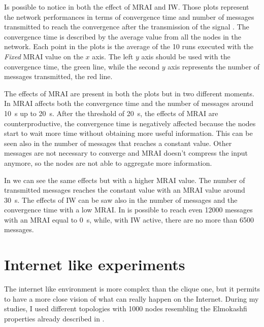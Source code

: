 Is possible to notice in  both the effect of \ac{MRAI}
and \ac{IW}.
Those plots represent the network performances in terms of convergence time and
number of messages transmitted to reach the convergence after the transmission
of the signal .
The convergence time is described by the average value from all the nodes in the
network.
Each point in the plots is the average of the \num{10} runs executed with the
\textit{Fixed} \ac{MRAI} value on the $x$ axis.
The left $y$ axis should be used with the convergence time, the green line, while
the second $y$ axis represents the number of messages transmitted, the red line.

The effects of \ac{MRAI} are present in both the plots but in two different
moments.
In  \ac{MRAI} affects both the convergence time and
the number of messages around \SI{10}{\second} up to \SI{20}{\second}.
After the threshold of \SI{20}{\second}, the effects of \ac{MRAI} are counterproductive,
the convergence time is negatively affected because the nodes start to wait more
time without obtaining more useful information.
This can be seen also in the number of messages that reaches a constant value.
Other messages are not necessary to converge and \ac{MRAI} doesn't compress
the input anymore, so the nodes are not able to aggregate more information.

In  we can see the same effects but with a higher
\ac{MRAI} value.
The number of transmitted messages reaches the constant value with an \ac{MRAI}
value around \SI{30}{\second}.
The effects of \ac{IW} can be saw also in the number of messages and the convergence
time with a low \ac{MRAI}.
In  is possible to reach even \num{12000} messages
with an \ac{MRAI} equal to \SI{0}{\second}, while, with \ac{IW} active, there are no
more than \num{6500} messages.

\section{Internet like experiments}
\label{sec:bgp_mrai_internet_like}

The internet like environment is more complex than the clique one, but it permits
to have a more close vision of what can really happen on the Internet.
During my studies, I used different topologies with \num{1000} nodes resembling
the Elmokashfi properties \cite{elmokashfi2010scalability} already
described in .

